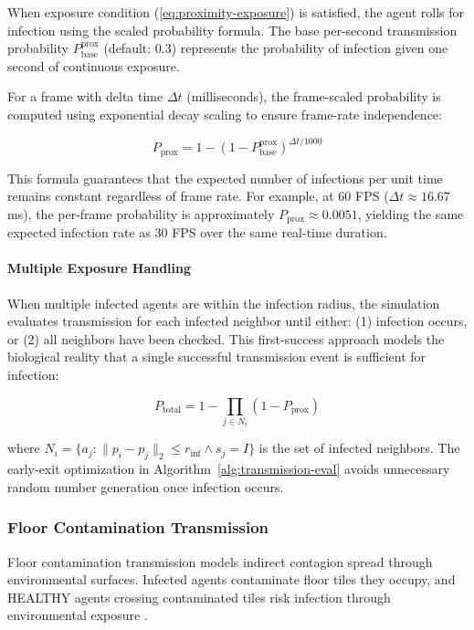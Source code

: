 When exposure condition (\ref{eq:proximity-exposure}) is satisfied, the agent rolls for infection using the scaled probability formula. The base per-second transmission probability $P_{\text{base}}^{\text{prox}}$ (default: 0.3) represents the probability of infection given one second of continuous exposure.

For a frame with delta time $\Delta t$ (milliseconds), the frame-scaled probability is computed using exponential decay scaling to ensure frame-rate independence:

\begin{equation}
\label{eq:prox-prob}
P_{\text{prox}} = 1 - (1 - P_{\text{base}}^{\text{prox}})^{\Delta t / 1000}
\end{equation}

This formula guarantees that the expected number of infections per unit time remains constant regardless of frame rate. For example, at 60 FPS ($\Delta t \approx 16.67$ ms), the per-frame probability is approximately $P_{\text{prox}} \approx 0.0051$, yielding the same expected infection rate as 30 FPS over the same real-time duration.

\paragraph{Multiple Exposure Handling}

When multiple infected agents are within the infection radius, the simulation evaluates transmission for each infected neighbor until either: (1) infection occurs, or (2) all neighbors have been checked. This first-success approach models the biological reality that a single successful transmission event is sufficient for infection:

\begin{equation}
\label{eq:multi-exposure}
P_{\text{total}} = 1 - \prod_{j \in N_i} (1 - P_{\text{prox}})
\end{equation}

where $N_i = \{a_j : \|p_i - p_j\|_2 \leq r_{\text{inf}} \land s_j = I\}$ is the set of infected neighbors. The early-exit optimization in Algorithm~\ref{alg:transmission-eval} avoids unnecessary random number generation once infection occurs.

\subsubsection{Floor Contamination Transmission}

Floor contamination transmission models indirect contagion spread through environmental surfaces. Infected agents contaminate floor tiles they occupy, and HEALTHY agents crossing contaminated tiles risk infection through environmental exposure \cite{perez2009agent}.

